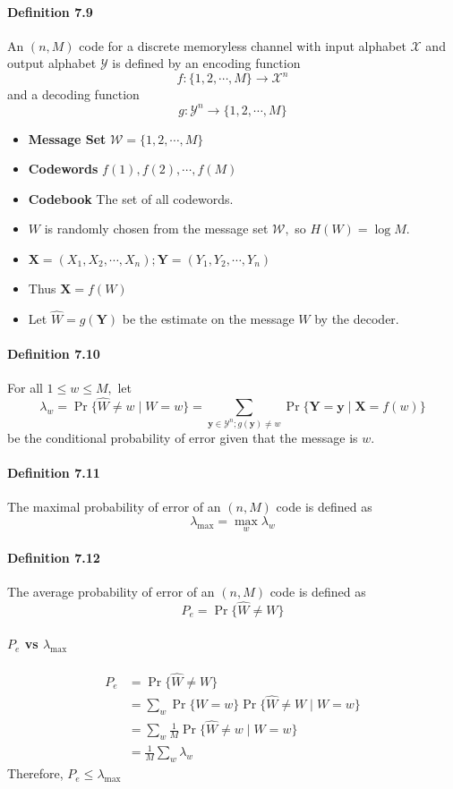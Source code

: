 \documentclass[8pt]{article}
\begin{document}
\paragraph{Definition 7.9} An $(n, M)$ code for a discrete memoryless channel with input alphabet $\mathcal{X}$ and output alphabet $\mathcal{Y}$ is defined by an encoding function
$$
f:\{1,2, \cdots, M\} \rightarrow \mathcal{X}^{n}
$$
and a decoding function
$$
g: \mathcal{Y}^{n} \rightarrow\{1,2, \cdots, M\}
$$
\begin{itemize}
	\item \textbf{Message Set} $\mathcal{W}=\{1,2, \cdots, M\}$
	\item \textbf{Codewords} $f(1), f(2), \cdots, f(M)$
	\item \textbf{Codebook} The set of all codewords.
	\item $W$ is randomly chosen from the message set $\mathcal{W},$ so $H(W)=\log M$.
	\item $\mathbf{X}=\left(X_{1}, X_{2}, \cdots, X_{n}\right) ; \mathbf{Y}=\left(Y_{1}, Y_{2}, \cdots, Y_{n}\right)$
	\item Thus $\mathbf{X}=f(W)$
	\item Let $\hat{W}=g(\mathbf{Y})$ be the estimate on the message $W$ by the decoder.
\end{itemize}

\paragraph{Definition 7.10} For all $1 \leq w \leq M,$ let
$$
\lambda_{w}=\operatorname{Pr}\{\hat{W} \neq w \mid W=w\}=\sum_{\mathbf{y} \in \mathcal{Y}^{n} ; g(\mathbf{y}) \neq w} \operatorname{Pr}\{\mathbf{Y}=\mathbf{y} \mid \mathbf{X}=f(w)\}
$$
be the conditional probability of error given that the message is $w$.
\paragraph{Definition 7.11} The maximal probability of error of an $(n, M)$ code is defined
as
$$
\lambda_{\max }=\max _{w} \lambda_{w}
$$
\paragraph{Definition 7.12} The average probability of error of an $(n, M)$ code is defined
as
$$
P_{e}=\operatorname{Pr}\{\hat{W} \neq W\}
$$
\paragraph{$P_{e}$ vs $\lambda_{\max }$}
$$
\begin{aligned}
P_{e} &=\operatorname{Pr}\{\hat{W} \neq W\} \\
&=\sum_{w} \operatorname{Pr}\{W=w\} \operatorname{Pr}\{\hat{W} \neq W \mid W=w\} \\
&=\sum_{w} \frac{1}{M} \operatorname{Pr}\{\hat{W} \neq w \mid W=w\} \\
&=\frac{1}{M} \sum_{w} \lambda_{w}
\end{aligned}
$$
Therefore, $P_{e} \leq \lambda_{\max }$
\end{document}
